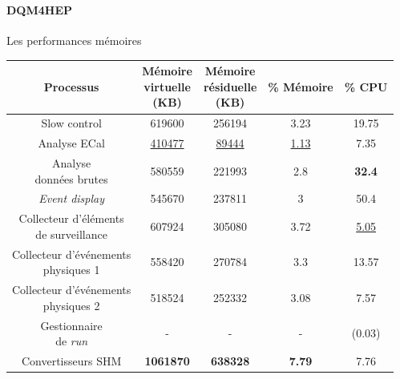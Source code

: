 \documentclass[8pt]{beamer}
\begin{document}
  \begin{frame}
  \frametitle{\secname}
  \framesubtitle{DQM4HEP}
    \begin{block}{Les performances mémoires}
      \begin{table}[!h]
        \begin{center}
        \setlength\tabcolsep{10pt}
          \begin{tabular}{c|c|c|c|c}
            Processus & \makecell{Mémoire \\ virtuelle \\ (KB)} & \makecell{Mémoire \\ résiduelle \\ (KB)} & \% Mémoire & \% CPU \\
            \hline \hline
            Slow control & 619600 & 256194 & 3.23 & 19.75 \\
            \hline
            Analyse ECal & \underline{410477} & \underline{89444} & \underline{1.13} & 7.35 \\
            \hline
            \makecell{Analyse \\ données brutes} & 580559 & 221993 & 2.8 & \textbf{32.4} \\
            \hline
            \textit{Event display} & 545670 & 237811 & 3 & 50.4 \\
            \hline \hline
            \makecell{Collecteur d'éléments \\ de surveillance} & 607924 & 305080 & 3.72 & \underline{5.05} \\
            \hline
            \makecell{Collecteur d'événements \\ physiques 1} & 558420 & 270784 & 3.3 & 13.57 \\
            \hline
            \makecell{Collecteur d'événements \\ physiques 2} & 518524 & 252332 & 3.08 & 7.57 \\
            \hline
            \makecell{Gestionnaire \\ de \textit{run}} & - & - & - & (0.03) \\
            \hline \hline
            Convertisseurs SHM & \textbf{1061870} & \textbf{638328} & \textbf{7.79} & 7.76
          \end{tabular}
        \end{center}
      \end{table}
    \end{block}
  \end{frame}
\end{document}
